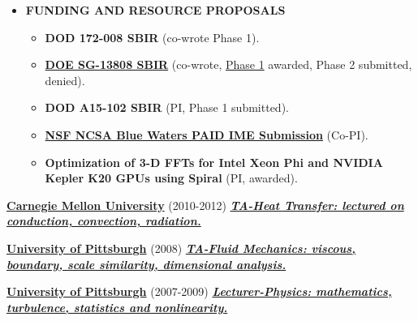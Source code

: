 \documentclass{article}
\newcommand{\employer}[3]{{ \textbf{#1} (#2) \underline{\textbf{\emph{#3}}}\\  }}
\newenvironment{achievements}{\begin{list}{$\bullet$}{\topsep 0pt \itemsep -2pt}}{\vspace*{4pt}\end{list}}
\begin{document}
\begin{itemize}
\begin{itemize}
  \end{itemize}

\item \textbf{FUNDING AND RESOURCE PROPOSALS}
        \begin{itemize}
          \item \textbf{DOD 172-008 SBIR} (co-wrote Phase 1).
          \item \textbf{\href{http://science.energy.gov/sbir/}{DOE SG-13808 SBIR}} (co-wrote, \href{https://www.osti.gov/scitech/servlets/purl/1242462}{Phase 1} awarded, Phase 2 submitted, denied).
          \item \textbf{DOD A15-102 SBIR} (PI, Phase 1 submitted).
          \item \textbf{\href{https://bluewaters.ncsa.illinois.edu/paid-ime-submissions}{NSF NCSA Blue Waters PAID IME Submission}} (Co-PI).
          \item \textbf{Optimization of 3-D FFTs for Intel Xeon Phi and NVIDIA Kepler K20 GPUs using Spiral} (PI, awarded).
        \end{itemize}


    \end{itemize}



\employer{\href{https://www.cmu.edu/me/}{Carnegie Mellon University}}{2010-2012}{TA-Heat Transfer: lectured on conduction, convection, radiation.}

\employer{\href{http://www.engineering.pitt.edu/MEMS/}{University of Pittsburgh}}{2008}{TA-Fluid Mechanics: viscous, boundary, scale similarity, dimensional analysis.}

\employer{\href{http://www.physicsandastronomy.pitt.edu/}{University of Pittsburgh}}{2007-2009}{Lecturer-Physics: mathematics, turbulence, statistics and nonlinearity.}
\end{document}
